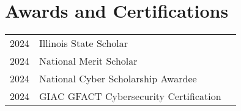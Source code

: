 \documentclass[]{deedy-resume-reversed}
\begin{document}
\begin{minipage}[t]{0.60\textwidth}






	\section{Awards and Certifications}
	\begin{tabular}{rll}
		2024 & Illinois State Scholar                 \\
		2024 & National Merit Scholar                 \\
		2024 & National Cyber Scholarship Awardee     \\
		2024 & GIAC GFACT Cybersecurity Certification \\
	\end{tabular}
	\sectionsep




\end{minipage}
\end{document}
